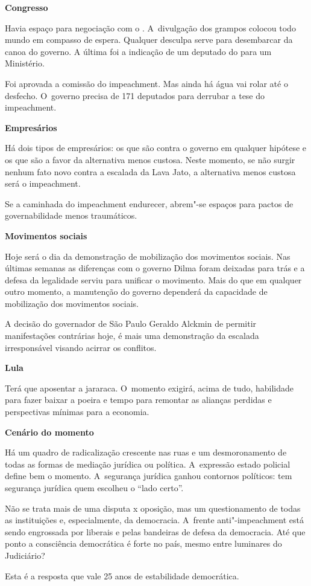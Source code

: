 \textbf{Congresso}

Havia espaço para negociação com o . A~divulgação dos grampos
colocou todo mundo em compasso de espera. Qualquer desculpa serve para
desembarcar da canoa do governo. A última foi a indicação de um deputado
do  para um Ministério.

Foi aprovada a comissão do impeachment. Mas ainda há água vai rolar até
o desfecho. O~governo precisa de 171 deputados para derrubar a tese do
impeachment.

\textbf{Empresários}

Há dois tipos de empresários: os que são contra o governo em qualquer
hipótese e os que são a favor da alternativa menos custosa. Neste
momento, se não surgir nenhum fato novo contra a escalada da Lava Jato,
a alternativa menos custosa será o impeachment.

Se a caminhada do impeachment endurecer, abrem"-se espaços para pactos de
governabilidade menos traumáticos.

\textbf{Movimentos sociais}

Hoje será o dia da demonstração de mobilização dos movimentos sociais.
Nas últimas semanas as diferenças com o governo Dilma foram deixadas
para trás e a defesa da legalidade serviu para unificar o movimento.
Mais do que em qualquer outro momento, a manutenção do governo dependerá
da capacidade de mobilização dos movimentos sociais.

A decisão do governador de São Paulo Geraldo Alckmin de permitir
manifestações contrárias hoje, é mais uma demonstração da escalada
irresponsável visando acirrar os conflitos.

\textbf{Lula}

Terá que aposentar a jararaca. O~momento exigirá, acima de tudo,
habilidade para fazer baixar a poeira e tempo para remontar as alianças
perdidas e perspectivas mínimas para a economia.

\textbf{Cenário do momento}

Há um quadro de radicalização crescente nas ruas e um desmoronamento de
todas as formas de mediação jurídica ou política. A~expressão estado
policial define bem o momento. A~segurança jurídica ganhou contornos
políticos: tem segurança jurídica quem escolheu o ``lado certo''.

Não se trata mais de uma disputa  x oposição, mas um questionamento de
todas as instituições e, especialmente, da democracia. A~frente
anti"-impeachment está sendo engrossada por liberais e pelas bandeiras de
defesa da democracia. Até que ponto a consciência democrática é forte no
país, mesmo entre luminares do Judiciário?

Esta é a resposta que vale 25 anos de estabilidade democrática.
